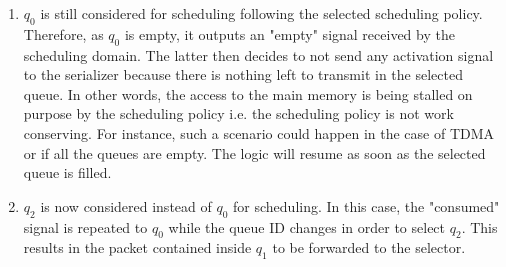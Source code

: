 \begin{enumerate}
\item $q_{0}$ is still considered for scheduling following the
  selected scheduling policy. Therefore, as $q_{0}$ is empty, it
  outputs an "empty" signal received by the scheduling domain.  The
  latter then decides to not send any activation signal to the
  serializer because there is nothing left to transmit in the selected
  queue.  In other words, the access to the main memory is being
  stalled on purpose by the scheduling policy i.e. the scheduling
  policy is not work conserving.  For instance, such a scenario could
  happen in the case of TDMA or if all the queues are empty.  The
  logic will resume as soon as the selected queue is filled.
\item $q_{2}$ is now considered instead of $q_{0}$ for scheduling.  In
  this case, the "consumed" signal is repeated to $q_{0}$ while the
  queue ID changes in order to select $q_{2}$.  This results in the
  packet contained inside $q_{1}$ to be forwarded to the selector.
\end{enumerate}

